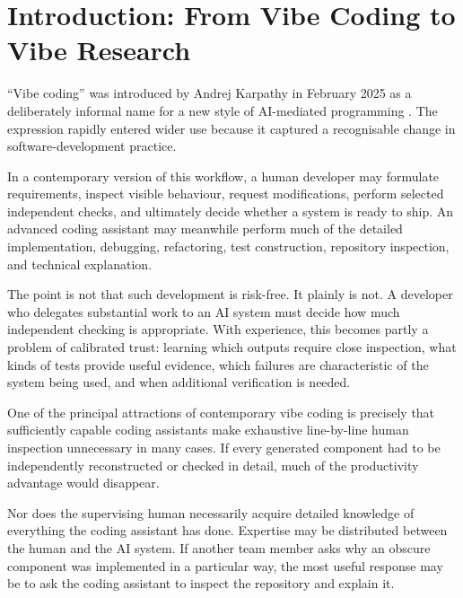 \begin{abstract}
Our purpose is not to argue that vibe research is risk-free, nor to propose a general rule for AI authorship. We instead identify an asymmetry between software engineering and academic research, examine some of its conceptual, technical, and institutional foundations, and ask whether current academic conventions accurately describe emerging forms of human--AI research collaboration.
\end{abstract}


\section{Introduction: From Vibe Coding to Vibe Research}

``Vibe coding'' was introduced by Andrej Karpathy in February 2025 as a deliberately informal name for a new style of AI-mediated programming \citep{fowler2026vibecoding}. The expression rapidly entered wider use because it captured a recognisable change in software-development practice.

In a contemporary version of this workflow, a human developer may formulate requirements, inspect visible behaviour, request modifications, perform selected independent checks, and ultimately decide whether a system is ready to ship. An advanced coding assistant may meanwhile perform much of the detailed implementation, debugging, refactoring, test construction, repository inspection, and technical explanation.

The point is not that such development is risk-free. It plainly is not. A developer who delegates substantial work to an AI system must decide how much independent checking is appropriate. With experience, this becomes partly a problem of calibrated trust: learning which outputs require close inspection, what kinds of tests provide useful evidence, which failures are characteristic of the system being used, and when additional verification is needed.

One of the principal attractions of contemporary vibe coding is precisely that sufficiently capable coding assistants make exhaustive line-by-line human inspection unnecessary in many cases. If every generated component had to be independently reconstructed or checked in detail, much of the productivity advantage would disappear.

Nor does the supervising human necessarily acquire detailed knowledge of everything the coding assistant has done. Expertise may be distributed between the human and the AI system. If another team member asks why an obscure component was implemented in a particular way, the most useful response may be to ask the coding assistant to inspect the repository and explain it.

